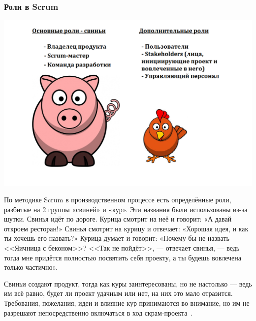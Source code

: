\documentclass{../industrial-development}
\begin{document}
\begin{frame} \frametitle{Роли в Scrum}
	\centerline{\includegraphics[width=1.50\textheight]{sc3.png}}
\end{frame}

\lecturenotes
По методике Scrum в производственном процессе есть определённые роли, разбитые на 2 группы \alert{«свиней»} и \alert{«кур»}. Эти названия были использованы из-за шутки.
Свинья идёт по дороге. Курица смотрит на неё и говорит: «А давай откроем ресторан!» Свинья смотрит на курицу и отвечает: «Хорошая идея, и как ты хочешь его назвать?» Курица думает и говорит: «Почему бы не назвать <<Яичница с беконом>>? <<Так не пойдёт>>, — отвечает свинья, — ведь тогда мне придётся полностью посвятить себя проекту, а ты будешь вовлечена только частично».

Свиньи создают продукт, тогда как куры заинтересованы, но не настолько — ведь им всё равно, будет ли проект удачным или нет, на них это мало отразится. Требования, пожелания, идеи и влияние кур принимаются во внимание, но им не разрешают непосредственно включаться в ход скрам-проекта~\cite[с.~54--56]{Рубин}.
\end{document}
